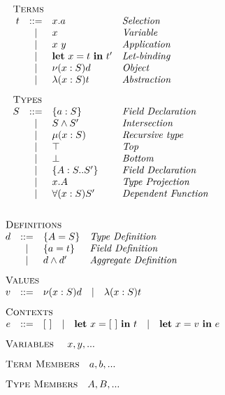 \begin{minipage}[t]{.5\textwidth}\[\begin{array}{r c l l}
    \multicolumn{4}{l}{\textsc{Terms}}                        \\
    t & ::= & x.a             & \textit{Selection           } \\
      &  |  & x               & \textit{Variable            } \\
      &  |  & x\ y            & \textit{Application         } \\
      &  |  & \LET{x}{t}{t'}  & \textit{Let-binding         } \\
      &  |  & \OBJ{x}{S}{d}   & \textit{Object              } \\
      &  |  & \ABS{x}{S}{t}   & \textit{Abstraction         } \\[3mm]
    \multicolumn{4}{l}{\textsc{Types}}                        \\
    S & ::= & \FDEC{a}{S}     & \textit{Field Declaration   } \\
      &  |  & \AGG{S}{S'}     & \textit{Intersection        } \\
      &  |  & \REC{x}{S}      & \textit{Recursive type      } \\
      &  |  & \top            & \textit{Top                 } \\
      &  |  & \bot            & \textit{Bottom              } \\
      &  |  & \TDEC{A}{S}{S'} & \textit{Field Declaration   } \\
      &  |  & x.A             & \textit{Type Projection     } \\
      &  |  & \DFUN{x}{S}{S'} & \textit{Dependent Function  } \\[3mm]
\end{array}\]\end{minipage}
\begin{minipage}[t]{.4\textwidth}\[\begin{array}{r c l l}
    \multicolumn{4}{l}{\textsc{Definitions}}                  \\
    d & ::= & \DEF{A}{S}      & \textit{Type Definition     } \\
      &  |  & \DEF{a}{t}      & \textit{Field Definition    } \\
      &  |  & \AGG{d}{d'}     & \textit{Aggregate Definition} \\[3mm]
    \multicolumn{4}{l}{\textsc{Values}} \\
    v & ::= & \multicolumn{2}{l}{\OBJ{x}{S}{d}
        \quad | \quad \ABS{x}{S}{t}} \\[3mm]
    \multicolumn{4}{l}{\textsc{Contexts}} \\
    e & ::= & \multicolumn{2}{l}{\HOL
        \quad | \quad \LET{x}{\HOL}{t}
        \quad | \quad \LET{x}{v}{e}} \\[3mm]
    \multicolumn{4}{l}{\textsc{Variables   } \quad x, y, ...} \\[3mm]
    \multicolumn{4}{l}{\textsc{Term Members} \quad a, b, ...} \\[3mm]
    \multicolumn{4}{l}{\textsc{Type Members} \quad A, B, ...} \\[3mm]
\end{array}\]\end{minipage}

